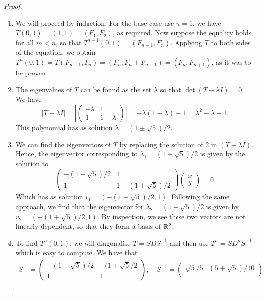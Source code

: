 \begin{proof}
    \begin{enumerate}
      \item We will proceed by induction. For the base case use $n=1$, we have $T(0,1)=(1,1)=(F_1,F_2)$, as required. Now suppose the equality holds for all $m<n$, so that $T^{n-1}(0,1)=(F_{n-1},F_n)$. Applying $T$ to both sides of the equation, we obtain $T^n(0,1)=T(F_{n-1},F_n)=(F_n, F_n+F_{n-1})=(F_n,F_{n+1})$, as it was to be proven.
      \item The eigenvalues of $T$ can be found as the set $\lambda$ so that $\det(T-\lambda I)=0$. We have
      \[\lvert T-\lambda I\rvert=
      \left\lvert 
      \begin{pmatrix}
          -\lambda & 1\\
          1 & 1-\lambda
      \end{pmatrix}
      \right\rvert=
      -\lambda(1-\lambda)-1= \lambda^2-\lambda-1.\]
      This polynomial has as solution $\lambda=(1\pm\sqrt{5})/2$.
      \item We can find the eigenvectors of $T$ by replacing the solution of 2 in $(T-\lambda I)$. Hence, the eigenvector corresponding to $\lambda_1=(1+\sqrt{5})/2$ is given by the solution to
      \[
      \begin{pmatrix}
          -(1+\sqrt{5})/2 & 1\\
          1 & 1-(1+\sqrt{5})/2
      \end{pmatrix}
      \begin{pmatrix}
          x\\
          y
      \end{pmatrix}=
      0.
      \]
      Which has as solution $v_1=(-(1-\sqrt{5})/2, 1)$. Following the same approach, we find that the eigenvector for $\lambda_2=(1-\sqrt{5})/2$ is given by $v_2=(-(1+\sqrt{5})/2, 1)$. By inspection, we see these two vectors are not linearly dependent, so that they form a basis of $\mathbb{R}^2$.
      \item To find $T^n(0,1)$, we will diagonalise $T=SDS^{-1}$ and then use $T^n=SD^nS^{-1}$ which is easy to compute. We have that
      \begin{align*}
      S&=
      \begin{pmatrix}
        -(1-\sqrt{5})/2 & -(1+\sqrt{5}/2\\
        1 &1
      \end{pmatrix},\quad
      S^{-1}=
      \begin{pmatrix}
        \sqrt{5}/5 & (5+\sqrt{5})/10\\

\end{pmatrix}
\end{align*}
\end{enumerate}
\end{proof}
